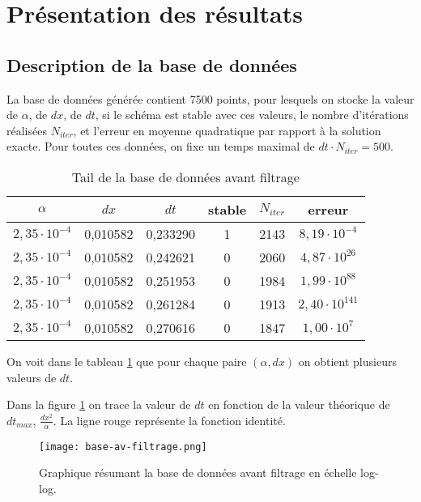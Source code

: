 \documentclass[a4paper,12pt,french]{article}
\begin{document}
\section{Présentation des résultats}
\subsection*{Description de la base de données}

La base de données générée contient 7500 points, pour lesquels on stocke la valeur de $\alpha$, de $dx$, de $dt$, si le schéma est stable avec ces valeurs, le nombre d'itérations réalisées $N_{iter}$, et l'erreur en moyenne quadratique par rapport à la solution exacte. Pour toutes ces données, on fixe un temps maximal de $dt \cdot N_{iter} = 500$.
\\

\begin{table}
\centering
\begin{tabular}{|c|c|c|c|c|c|}
\hline 
$\alpha$ & $dx$ & $dt$ & stable & $N_{iter}$ & erreur\\	 
\hline 
$2,35\cdot 10^{-4}$ & 0,010582 & 0,233290 & 1 & 2143 & $8,19\cdot 10^{-4}$ \\ 
\hline 
$2,35\cdot 10^{-4}$ & 0,010582 & 0,242621 & 0 & 2060 & $4,87\cdot 10^{26}$ \\ 
\hline 
$2,35\cdot 10^{-4}$ & 0,010582 & 0,251953 & 0 & 1984 & $1,99\cdot 10^{88}$ \\ 
\hline 
$2,35\cdot 10^{-4}$ & 0,010582 & 0,261284 & 0 & 1913 & $2,40\cdot 10^{141}$ \\ 
\hline 
$2,35\cdot 10^{-4}$ & 0,010582 & 0,270616 & 0 & 1847 & $1,00\cdot 10^{7}$ \\ 
\hline 
\end{tabular} 
\caption{Tail de la base de données avant filtrage}
\label{tab:tailraw}
\end{table}

On voit dans le tableau \ref{tab:tailraw} que pour chaque paire $(\alpha,dx)$ on obtient plusieurs valeurs de $dt$.

Dans la figure \ref{fig:graph-av-filtrage} on trace la valeur de $dt$ en fonction de la valeur théorique de $dt_{max}$, $\frac{dx^2}{\alpha}$. La ligne rouge représente la fonction identité.
\begin{figure}[ht!]
    \centering
    \texttt{[image: base-av-filtrage.png]}
    \caption{Graphique résumant la base de données avant filtrage en échelle log-log.}
    \label{fig:graph-av-filtrage}
\end{figure}
\end{document}
